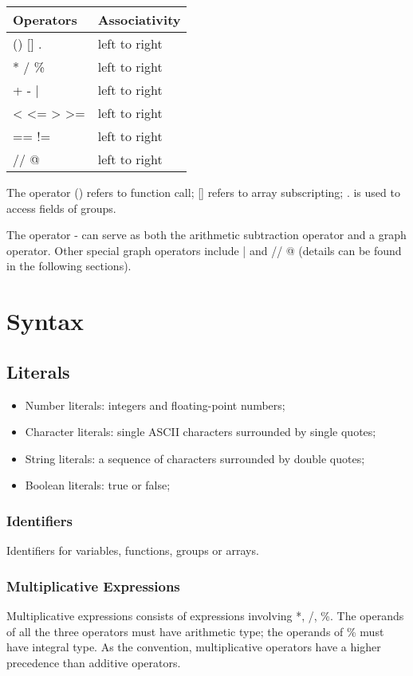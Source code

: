 \documentclass[11pt,letterpaper]{article}
\begin{document}
\begin{center}
    \begin{tabular}{| p{4cm} | p{4cm} |}		\hline
    Operators 		& Associativity \\ 		\hline \hline
    () [] . 			& left to right \\ 		\hline
    *  /  \% 		& left to right \\ 		\hline
    +  -  |			& left to right \\ 		\hline
    <  <=  >  >=		& left to right \\ 		\hline
    ==  !=			& left to right \\ 		\hline
    // @				& left to right \\ 		\hline
    
    \end{tabular}
\end{center}

The operator () refers to function call; [] refers to array subscripting; . is used to access fields of groups. 

The operator - can serve as both the arithmetic subtraction operator and a graph operator.  Other special graph operators include | and // @ (details can be found in the following sections).

\section {Syntax}
\subsection {Literals}
\begin{itemize}
\item Number literals: integers and floating-point numbers;
\item Character literals: single ASCII characters surrounded by single quotes;
\item String literals: a sequence of characters surrounded by double quotes;
\item Boolean literals: true or false;
\end{itemize}
\subsubsection {Identifiers}
Identifiers for variables, functions, groups or arrays.

\subsubsection {Multiplicative Expressions}
Multiplicative expressions consists of expressions involving *, /, \%. The operands of all the three operators must have arithmetic type; the operands of \% must have integral type. As the convention, multiplicative operators have a higher precedence than additive operators. 
\end{document}
